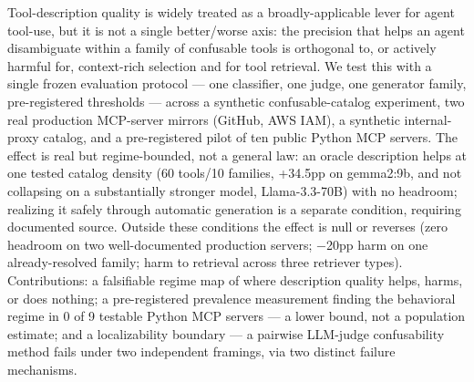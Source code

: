 Tool-description quality is widely treated as a broadly-applicable lever
for agent tool-use, but it is not a single better/worse axis: the
precision that helps an agent disambiguate within a family of confusable
tools is orthogonal to, or actively harmful for, context-rich selection
and for tool retrieval. We test this with a single frozen evaluation
protocol --- one classifier, one judge, one generator family,
pre-registered thresholds --- across a synthetic confusable-catalog
experiment, two real production MCP-server mirrors (GitHub, AWS IAM), a
synthetic internal-proxy catalog, and a pre-registered pilot of ten
public Python MCP servers. The effect is real but regime-bounded, not a
general law: an oracle description helps at one tested catalog density
(60 tools/10 families, +34.5pp on gemma2:9b, and not collapsing on a
substantially stronger model, Llama-3.3-70B) with no headroom; realizing
it safely through automatic generation is a separate condition,
requiring documented source. Outside these conditions the effect is
null or reverses (zero headroom on two well-documented production
servers; −20pp harm on one already-resolved family; harm to retrieval
across three retriever types). Contributions: a falsifiable regime map
of where description quality helps, harms, or does nothing; a
pre-registered prevalence measurement finding the behavioral regime in
0 of 9 testable Python MCP servers --- a lower bound, not a population
estimate; and a localizability boundary --- a pairwise LLM-judge
confusability method fails under two independent framings, via two
distinct failure mechanisms.
